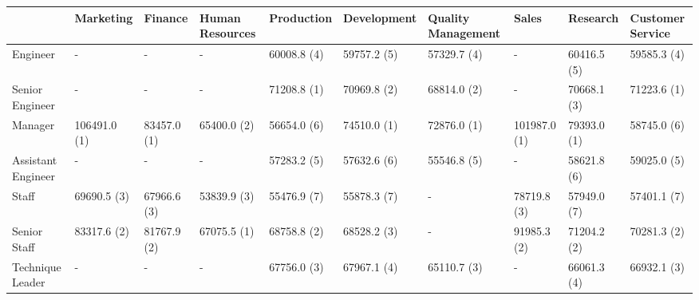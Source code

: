 \begin{tabular}{l|lllllllll}
\toprule
 & Marketing & Finance & Human Resources & Production & Development & Quality Management & Sales & Research & Customer Service \\ \hline
\midrule
Engineer & - & - & - & 60008.8 (4) & 59757.2 (5) & 57329.7 (4) & - & 60416.5 (5) & 59585.3 (4) \\
Senior Engineer & - & - & - & 71208.8 (1) & 70969.8 (2) & 68814.0 (2) & - & 70668.1 (3) & 71223.6 (1) \\
Manager & 106491.0 (1) & 83457.0 (1) & 65400.0 (2) & 56654.0 (6) & 74510.0 (1) & 72876.0 (1) & 101987.0 (1) & 79393.0 (1) & 58745.0 (6) \\
Assistant Engineer & - & - & - & 57283.2 (5) & 57632.6 (6) & 55546.8 (5) & - & 58621.8 (6) & 59025.0 (5) \\
Staff & 69690.5 (3) & 67966.6 (3) & 53839.9 (3) & 55476.9 (7) & 55878.3 (7) & - & 78719.8 (3) & 57949.0 (7) & 57401.1 (7) \\
Senior Staff & 83317.6 (2) & 81767.9 (2) & 67075.5 (1) & 68758.8 (2) & 68528.2 (3) & - & 91985.3 (2) & 71204.2 (2) & 70281.3 (2) \\
Technique Leader & - & - & - & 67756.0 (3) & 67967.1 (4) & 65110.7 (3) & - & 66061.3 (4) & 66932.1 (3) \\
\bottomrule
\end{tabular}
